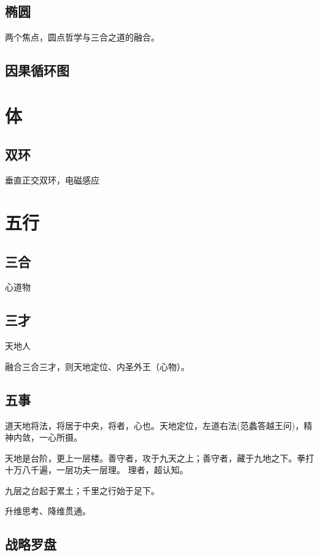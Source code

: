 \subsection{椭圆}

两个焦点，圆点哲学与三合之道的融合。

\subsection{因果循环图}

\section{体}

\subsection{双环}

垂直正交双环，电磁感应

\section{五行}

\subsection{三合}

心道物

\subsection{三才}

天地人

融合三合三才，则天地定位、内圣外王（心物）。

\subsection{五事}

道天地将法，将居于中央，将者，心也。天地定位，左道右法(范蠡答越王问)，精神内敛，一心所摄。

天地是台阶，更上一层楼。善守者，攻于九天之上；善守者，藏于九地之下。拳打十万八千遍，一层功夫一层理。
理者，超认知。

九层之台起于累土；千里之行始于足下。

升维思考、降维贯通。

\subsection{战略罗盘}

